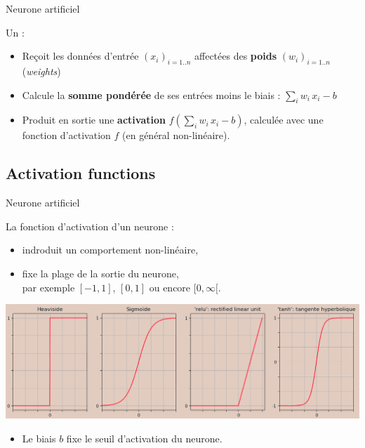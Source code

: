 \documentclass[10pt,serif,mathserif,compress,hyperref={colorlinks}]{beamer}
\begin{document}
\begin{frame}{Neurone artificiel}
\begin{tcolorbox}[title=Le modèle informatique du neurone artificiel]
  \end{tcolorbox}
  
  Un :
    \begin{itemize}
    \item Reçoit les données d'entrée $(x_{i})_{i=1..n}$ affectées des \textbf{poids} $(w_i)_{i=1..n}$ ({\em weights}) 
    \item Calcule la \textbf{somme pondérée} de ses entrées moins le biais : $\sum_i{w_{i}\,x_i} - b$
    \item Produit en sortie une \textbf{activation} $f(\sum_i{w_{i}\,x_i} - b)$, calculée avec une fonction d'activation $f$ (en général non-linéaire).
    \end{itemize}

\end{frame}

\subsection{Activation functions}

\begin{frame}{Neurone artificiel}

  La fonction d'activation d'un neurone :
  \begin{itemize}
  \item indroduit un comportement non-linéaire,
  \item fixe la plage de la sortie du neurone,\\
    par exemple $[-1, 1]$, $[0, 1]$ ou encore $[0, \infty[$.
  \end{itemize}    

  \begin{tcolorbox}[title={\small Exemples de fonctions d'activation souvent utilisées}]
    \includegraphics[width=\textwidth]{images/activ_functions-2.png}
  \end{tcolorbox}

  \begin{itemize}
  \item Le biais $b$ fixe le seuil d'activation du neurone.
  \end{itemize}    
   
\end{frame}
\end{document}
